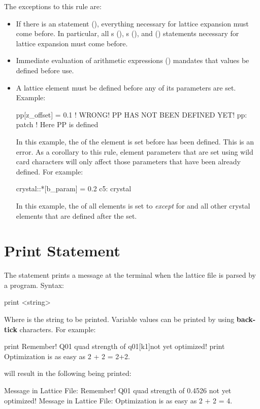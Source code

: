 {{{{{The exceptions to this rule are:
\begin{itemize}
\item 
If there is an  statement (), everything necessary for
lattice expansion must come before. In particular, all s
(), s (), and  () statements
necessary for lattice expansion must come before.
\item
Immediate evaluation of arithmetic expressions () mandates that values be defined
before use.
\item
A lattice element must be defined before any of its parameters are set. Example:
\begin{example2}
  pp[z_offset] = 0.1    ! WRONG! PP HAS NOT BEEN DEFINED YET!
  pp: patch             ! Here PP is defined
\end{example2}
In this example, the  of the element  is set before  has been
defined. This is an error. As a corollary to this rule, element parameters that are set 
using wild card characters will only affect those parameters that have been already defined. For
example:
\begin{example2}
  crystal::*[b_param] = 0.2
  c5: crystal
\end{example2}
In this example, the  of all  elements is set to  {\em except} for
 and all other crystal elements that are defined after the set.
\end{itemize}

\section{Print Statement}
\label{s:print}

The  statement prints a message at the terminal when the 
lattice file is parsed by a program. Syntax:
\begin{example}
  print <string>
\end{example}
Where  is the string to be printed. Variable values can be printed by using
\textbf{back-tick} characters. For example:
\begin{example}
  print Remember! Q01 quad strength of \backtick{}q01[k1]\backtick not yet optimized!
  print Optimization is as easy as 2 + 2 = \backtick{}2+2\backtick.
\end{example}
will result in the following being printed:
\begin{example}
  Message in Lattice File: Remember! Q01 quad strength of 0.4526 not yet optimized!
  Message in Lattice File: Optimization is as easy as 2 + 2 = 4.
\end{example}

}}}}}
